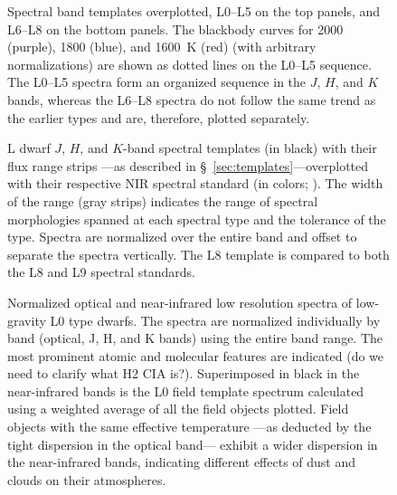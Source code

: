 \documentclass[12pt,preprint]{aastex}
\begin{document}
\begin{figure}
	\caption{Spectral band templates overplotted, L0--L5 on the top panels, and L6--L8 on the bottom panels. The blackbody curves for 2000 (purple), 1800 (blue), and 1600~K (red) (with arbitrary normalizations) are shown as dotted lines on the L0--L5 sequence. The L0--L5 spectra form an organized sequence in the $J$, $H$, and $K$ bands, whereas the L6--L8 spectra do not follow the same trend as the earlier types and are, therefore, plotted separately.}
	\label{fig:spec_sequence}
\end{figure}


\begin{figure}
		\caption{
	L dwarf $J$, $H$, and $K$-band spectral templates (in black) with their flux range strips ---as described in \S~\ref{sec:templates}---overplotted with their respective NIR spectral standard (in colors; \cite{Kirkpatrick10}). 
	The width of the range (gray strips) indicates the range of spectral morphologies spanned at each spectral type and the tolerance of the type.
	Spectra are normalized over the entire band and offset to separate the spectra vertically.
	The L8 template is compared to both the L8 and L9 spectral standards. }
	\label{fig:templates-stds}
\end{figure}


\begin{figure}
	\caption{Normalized optical and near-infrared low resolution spectra of low-gravity L0 type
dwarfs. The spectra are normalized individually by band (optical, J, H, and K bands)
using the entire band range. The most prominent atomic and molecular features are indicated
(do we need to clarify what H2 CIA is?). Superimposed in black in the near-infrared
bands is the L0 field template spectrum calculated using a weighted average of all the
field objects plotted. Field objects with the same effective temperature —as deducted by
the tight dispersion in the optical band— exhibit a wider dispersion in the
near-infrared bands, indicating different effects of dust and clouds on their
atmospheres.}
\label{fig:L0lg}
\end{figure}
\end{document}
